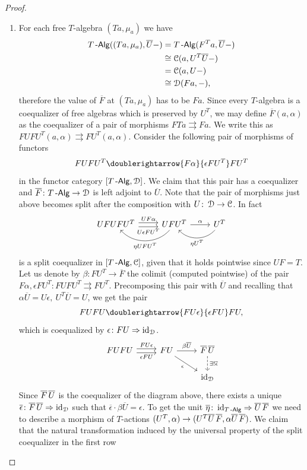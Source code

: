 \documentclass[a4paper,11pt,oneside,openany]{scrbook}
\begin{document}
	\begin{proof}
	\begin{enumerate}
	\item For each free $T$-algebra $(Ta,\mu_a)$ we have
	\begin{align*}
	T\operatorname{-\mathsf{Alg}}((Ta,\mu_a),\overline{U}-)&=T\operatorname{-\mathsf{Alg}}(F^Ta,\overline{U}-)\\
	&\cong\operatorname{\mathcal{C}}(a, U^T\overline{U}-)\\
	&=\operatorname{\mathcal{C}}(a,U-)\\
	&\cong\operatorname{\mathcal{D}}(Fa,-),
	\end{align*} 
	therefore the value of $\overline{F}$ at $(Ta,\mu_a)$ has to be $Fa$. Since every $T$-algebra is a coequalizer of free algebras which is preserved by $U^T$, we may define $\overline{F}(a,\alpha)$ as the coequalizer of a pair of morphisms $FTa\rightrightarrows Fa$. We write this as $FUFU^T(a,\alpha)\rightrightarrows FU^T(a,\alpha)$. Consider the following pair of morphisms of functors $$FUFU^T\doublerightarrow{F\alpha}{\epsilon FU^T}FU^T$$ in the functor category $[T\operatorname{-\mathsf{Alg}}, \operatorname{\mathcal{D}}]$. We claim that this pair has a coequalizer and $\overline{F}\colon T\operatorname{-\mathsf{Alg}}\to\operatorname{\mathcal{D}}$ is left adjoint to $\overline{U}$. Note that the pair of morphisms just above becomes split after the composition with $U\colon\operatorname{\mathcal{D}}\to\operatorname{\mathcal{C}}$. In fact
	\[
	\begin{tikzcd}
	UFUFU^T\arrow[r, shift left, "UF\alpha"] \arrow[r, shift right, "U\epsilon FU^T"']
	&UFU^T  \arrow[r, "\alpha"] \arrow[l, bend left=49, "\eta UFU^T"] & U^T\arrow[l, bend left=49, "\eta U^T"]
	\end{tikzcd}
	\]
	is a split coequalizer in $[T\operatorname{-\mathsf{Alg}}, \operatorname{\mathcal{C}}]$, given that it holds pointwise since $UF=T$. Let us denote by $\beta\colon FU^T\to\overline{F}$ the colimit (computed pointwise) of the pair $F\alpha, \epsilon FU^T\colon FUFU^T\rightrightarrows FU^T$. Precomposing this pair with $\overline{U}$ and recalling that $\alpha\overline{U}=U\epsilon, \ U^T\overline{U}=U$, we get the pair  
	$$FUFU\doublerightarrow{FU\epsilon}{\epsilon FU}FU,$$
	which is coequalized by $\epsilon\colon FU\Rightarrow\operatorname{id}_{\operatorname{\mathcal{D}}}$. 
	\[
	\begin{tikzcd}
	FUFU\arrow[r, shift left, "FU\epsilon"] \arrow[r, shift right, "\epsilon FU"']
	&FU \ar[dr, "\epsilon"'] \arrow[r, "\beta\overline{U}"]  & \overline{F}\hspace{.5mm}\overline{U}\arrow[d, dashed, "\exists!\overline{\epsilon}"]\\
	&& \id_{\D}
	\end{tikzcd}
	\]
	Since $\overline{F}\hspace{.5mm}\overline{U}$ is the coequalizer of the diagram above, there exists a unique $\overline{\epsilon}\colon\overline{F}\hspace{.5mm}\overline{U}\Rightarrow\operatorname{id}_{\operatorname{\mathcal{D}}}$ such that $\overline{\epsilon}\cdot\beta\overline{U}=\epsilon$. To get the unit $\overline{\eta}\colon\operatorname{id}_{T\operatorname{-\mathsf{Alg}}}\Rightarrow\overline{U}\hspace{.5mm}\overline{F}$ we need to describe a morphism of $T$-actions $(U^T,\alpha)\to(U^T\overline{U}\hspace{.5mm}\overline{F},\alpha\overline{U}\hspace{.5mm}\overline{F})$. We claim that the natural transformation induced by the universal property of the split coequalizer in the first row

\end{enumerate}
\end{proof}
\end{document}
